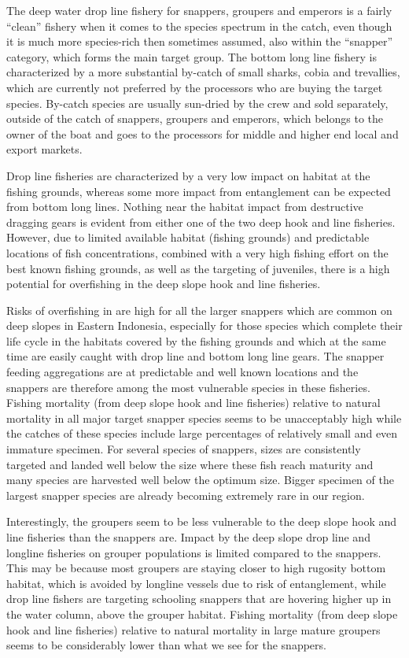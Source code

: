 The deep water drop line fishery for snappers, groupers and emperors is a fairly ``clean'' fishery when it comes to the species spectrum in the catch, even though it is much more species-rich then sometimes assumed, also within the ``snapper'' category, which forms the main target group. The bottom long line fishery is characterized by a more substantial by-catch of small sharks, cobia and trevallies, which are currently not preferred by the processors who are buying the target species. By-catch species are usually sun-dried by the crew and sold separately, outside of the catch of snappers, groupers and emperors, which belongs to the owner of the boat and goes to the processors for middle and higher end local and export markets.

Drop line fisheries are characterized by a very low impact on habitat at the fishing grounds, whereas some more impact from entanglement can be expected from bottom long lines. Nothing near the habitat impact from destructive dragging gears is evident from either one of the two deep hook and line fisheries. However, due to limited available habitat (fishing grounds) and predictable locations of fish concentrations, combined with a very high fishing effort on the best known fishing grounds, as well as the targeting of juveniles, there is a high potential for overfishing in the deep slope hook and line fisheries.
 
Risks of overfishing in are high for all the larger snappers which are common on deep slopes in Eastern Indonesia, especially for those species which complete their life cycle in the habitats covered by the fishing grounds and which at the same time are easily caught with drop line and bottom long line gears. The snapper feeding aggregations are at predictable and well known locations and the snappers are therefore among the most vulnerable species in these fisheries. Fishing mortality (from deep slope hook and line fisheries) relative to natural mortality in all major target snapper species seems to be unacceptably high while the catches of these species include large percentages of relatively small and even immature specimen. For several species of snappers, sizes are consistently targeted and landed well below the size where these fish reach maturity and many species are harvested well below the optimum size. Bigger specimen of the largest snapper species are already becoming extremely rare in our region.

Interestingly, the groupers seem to be less vulnerable to the deep slope hook and line fisheries than the snappers are. Impact by the deep slope drop line and longline fisheries on grouper populations is limited compared to the snappers. This may be because most groupers are staying closer to high rugosity bottom habitat, which is avoided by longline vessels due to risk of entanglement, while drop line fishers are targeting schooling snappers that are hovering higher up in the water column, above the grouper habitat. Fishing mortality (from deep slope hook and line fisheries) relative to natural mortality in large mature groupers seems to be considerably lower than what we see for the snappers.

